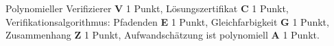 \begin{bewertung}
Polynomieller Verifizierer {\bf V} 1 Punkt,
Lösungszertifikat {\bf C} 1 Punkt,
Verifikationsalgorithmus: Pfadenden {\bf E} 1 Punkt,
Gleichfarbigkeit {\bf G} 1 Punkt,
Zusammenhang {\bf Z} 1 Punkt,
Aufwandschätzung ist polynomiell {\bf A} 1 Punkt.
\end{bewertung}


